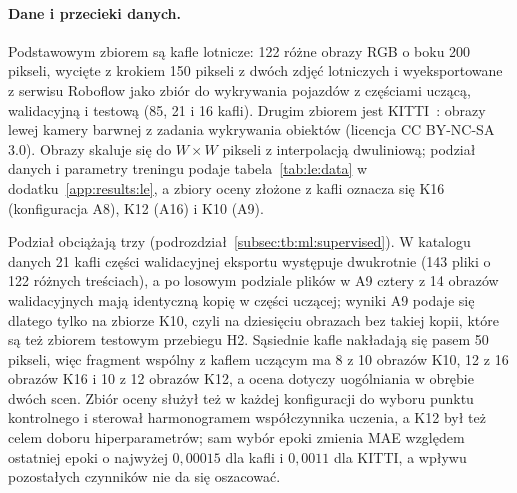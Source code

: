 \paragraph{Dane i przecieki danych.}\label{par:le:data}\label{par:le:leakage}
Podstawowym zbiorem są kafle lotnicze: 122 różne obrazy RGB o boku 200 pikseli, wycięte z krokiem 150 pikseli z dwóch zdjęć lotniczych i wyeksportowane z serwisu Roboflow jako zbiór do wykrywania pojazdów z częściami uczącą, walidacyjną i testową (85, 21 i 16 kafli).
Drugim zbiorem jest KITTI~\cite{geiger_kitti_2012}: obrazy lewej kamery barwnej z zadania wykrywania obiektów (licencja CC BY-NC-SA 3.0).
Obrazy skaluje się do $W\times W$ pikseli z interpolacją dwuliniową; podział danych i parametry treningu podaje tabela~\ref{tab:le:data} w dodatku~\ref{app:results:le}, a zbiory oceny złożone z kafli oznacza się K16 (konfiguracja A8), K12 (A16) i K10 (A9).

Podział obciążają trzy  (podrozdział~\ref{subsec:tb:ml:supervised}).
W katalogu danych 21 kafli części walidacyjnej eksportu występuje dwukrotnie (143 pliki o 122 różnych treściach), a po losowym podziale plików w A9 cztery z 14 obrazów walidacyjnych mają identyczną kopię w części uczącej; wyniki A9 podaje się dlatego tylko na zbiorze K10, czyli na dziesięciu obrazach bez takiej kopii, które są też zbiorem testowym przebiegu H2.
Sąsiednie kafle nakładają się pasem 50 pikseli, więc fragment wspólny z kaflem uczącym ma 8 z 10 obrazów K10, 12 z 16 obrazów K16 i 10 z 12 obrazów K12, a ocena dotyczy uogólniania w obrębie dwóch scen.
Zbiór oceny służył też w każdej konfiguracji do wyboru punktu kontrolnego i sterował harmonogramem współczynnika uczenia, a K12 był też celem doboru hiperparametrów; sam wybór epoki zmienia MAE względem ostatniej epoki o najwyżej $0{,}00015$ dla kafli i $0{,}0011$ dla KITTI, a wpływu pozostałych czynników nie da się oszacować.


